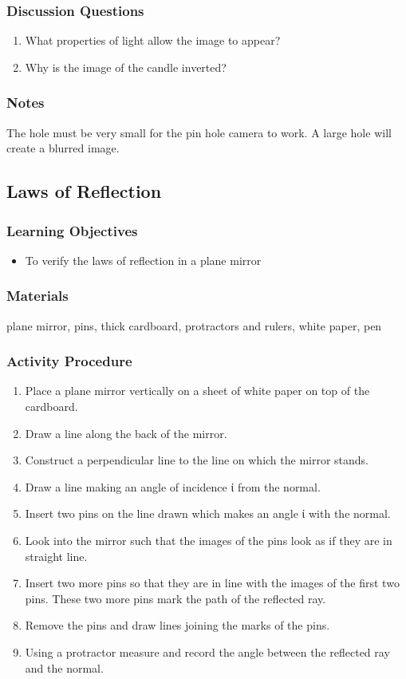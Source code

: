 \subsubsection*{Discussion Questions}
\begin{enumerate}
\item{What properties of light allow the image to appear?}
\item{Why is the image of the candle inverted?}
\end{enumerate}

\subsubsection*{Notes}
The hole must be very small for the pin hole camera to work. A large hole will create a blurred image.  


\subsection{Laws of Reflection}

\subsubsection*{Learning Objectives}
\begin{itemize}
\item{To verify the laws of reflection in a plane mirror}
\end{itemize}

\subsubsection*{Materials}
plane mirror, pins, thick cardboard, protractors and rulers, white paper, pen

\subsubsection{Activity Procedure}
\begin{enumerate}
\item{Place a plane mirror vertically on a sheet of white paper on top of the cardboard.}
\item{Draw a line along the back of the mirror.}
\item{Construct a perpendicular line to the line on which the mirror stands.}  
\item{Draw a line making an angle of incidence ί from the normal.}
\item{Insert two pins on the line drawn which makes an angle ί with the normal.}
\item{Look into the mirror such that the images of the pins look as if they are in straight line.}
\item{Insert two more pins so that they are in line with the images of the first two pins.  These two more pins mark the path of the reflected ray.}
\item{Remove the pins and draw lines joining the marks of the pins.}
\item{Using a protractor measure and record the angle between the reflected ray and the normal.}
\end{enumerate}


